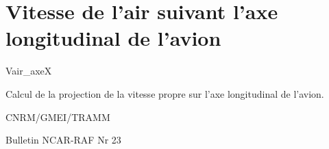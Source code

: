 %
\section{Vitesse de l'air suivant l'axe longitudinal de l'avion}

 {\sf Vair\_axeX}

Calcul de la projection de la vitesse propre sur l'axe
longitudinal de l'avion. 

\bigskip





CNRM/GMEI/TRAMM

Bulletin NCAR-RAF Nr 23 \cite{RAF-23} 
